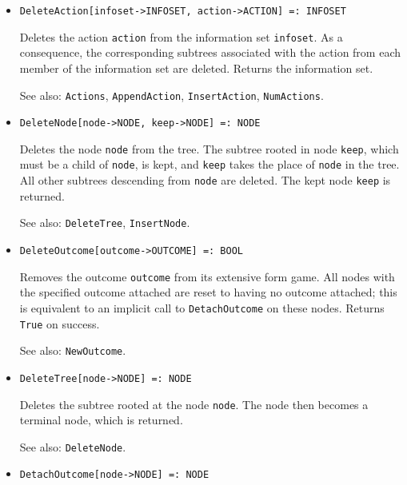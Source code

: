 \begin{itemize}
\item
\protect \large \begin{verbatim}
DeleteAction[infoset->INFOSET, action->ACTION] =: INFOSET
\end{verbatim}\normalsize

\bd
Deletes the action \verb+action+ from the information set
\verb+infoset+.  As a consequence, the corresponding subtrees associated
with the action from each member of the information set are deleted.
Returns the information set.
\item
[See also:] {\tt Actions}, {\tt AppendAction}, {\tt InsertAction},
{\tt NumActions}.
\ed

\item
\protect \large \begin{verbatim}
DeleteNode[node->NODE, keep->NODE] =: NODE
\end{verbatim}\normalsize

\bd
Deletes the node \verb+node+ from the tree.  The
subtree rooted in node \verb+keep+, which must be a child of
\verb+node+, is kept, and \verb+keep+ takes the place of \verb+node+ in
the tree.  All other subtrees descending from \verb+node+ are deleted.
The kept node \verb+keep+ is returned.
\item
[See also:] {\tt DeleteTree}, {\tt InsertNode}.
\ed

\item
\protect \large \begin{verbatim}
DeleteOutcome[outcome->OUTCOME] =: BOOL
\end{verbatim}\normalsize

\bd
Removes the outcome \verb+outcome+ from its extensive
form game.  All nodes with the specified outcome attached are reset to
having no outcome attached; this is equivalent to an implicit call to
{\tt DetachOutcome} on these nodes.  Returns \verb+True+ on success.
\item
[See also:] {\tt NewOutcome}.
\ed

\item
\protect \large \begin{verbatim}
DeleteTree[node->NODE] =: NODE
\end{verbatim}\normalsize

\bd
Deletes the subtree rooted at the node \verb+node+.  The
node then becomes a terminal node, which is returned.
\item
[See also:] {\tt DeleteNode}.
\ed

\item
\protect \large \begin{verbatim}
DetachOutcome[node->NODE] =: NODE
\end{verbatim}\normalsize


\end{itemize}
